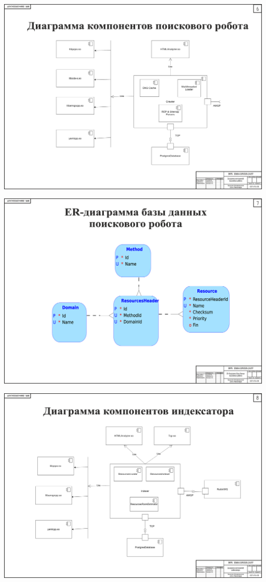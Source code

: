 \begin{landscape}
\begin{плакат}
    \includegraphics[width=0.82\linewidth]{posters/pr1.eps}
    \label{pr1:image}      
\end{плакат}

\begin{плакат}
    \includegraphics[width=0.82\linewidth]{posters/pr2.eps}
    \label{pr2:image}      
\end{плакат}

\begin{плакат}
    \includegraphics[width=0.82\linewidth]{posters/pi1.eps}
    \label{pi1:image}      
\end{плакат}


\end{landscape}
